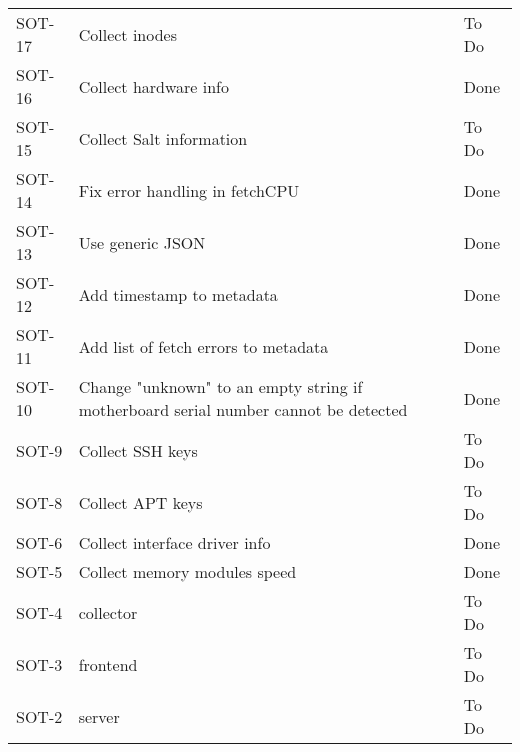 \documentclass[dutch]{article}
\begin{document}
\begin{longtable}{@{}lp{6cm}l@{}}
    SOT-17             & Collect inodes                                                                                                            & To Do           \\
    SOT-16             & Collect hardware info                                                                                                     & Done            \\
    SOT-15             & Collect Salt information                                                                                                  & To Do           \\
    SOT-14             & Fix error handling in fetchCPU                                                                                            & Done            \\
    SOT-13             & Use generic JSON                                                                                                          & Done            \\
    SOT-12             & Add timestamp to metadata                                                                                                 & Done            \\
    SOT-11             & Add list of fetch errors to metadata                                                                                      & Done            \\
    SOT-10             & Change "unknown" to an empty string if motherboard serial number cannot be detected                                       & Done            \\
    SOT-9              & Collect SSH keys                                                                                                          & To Do           \\
    SOT-8              & Collect APT keys                                                                                                          & To Do           \\
    SOT-6              & Collect interface driver info                                                                                             & Done            \\
    SOT-5              & Collect memory modules speed                                                                                              & Done            \\
    SOT-4              & collector                                                                                                                 & To Do           \\
    SOT-3              & frontend                                                                                                                  & To Do           \\
    SOT-2              & server                                                                                                                    & To Do           \\* \bottomrule
\end{longtable}
\end{document}
